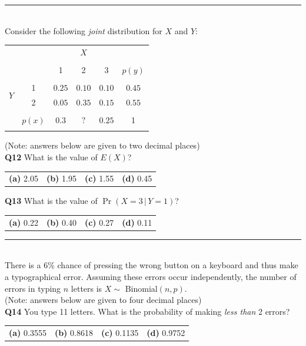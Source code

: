 \documentclass[12pt]{article}
\begin{document}
\rule{\linewidth}{1pt}
\quad\\
Consider the following \emph{joint} distribution for $X$ and $Y$:
\begin{center}
\begin{tabular}{c|c|ccc|c|}
\multicolumn{2}{c}{} & \multicolumn{3}{c}{$X$} & \multicolumn{1}{c}{}\\
\cline{2-6}
&&&&&\\[-0.4cm]
&&                          1 & 2 & 3 & $p(y)$\\
\cline{2-6}
&&&&&\\[-0.3cm]
\multirow{2}{*}{$Y$} & 1 & $0.25$ &  $0.10$  & $0.10$ & $0.45$ \\[0.1cm]
                     & 2 & $0.05$ &  $0.35$  & $0.15$ & $0.55$ \\[0.1cm]
\cline{2-6}
&&&&&\\[-0.3cm]
& $p(x)$ & $0.3$ & $?$ & $0.25$ & 1 \\[0.1cm]
\cline{2-6}
\multicolumn{6}{c}{}\\[-0.4cm]
\end{tabular}
\end{center}
{\footnotesize(Note: answers below are given to two decimal places)}\\[-0.1cm]

{\bf Q12} What is the value of $E(X)$?\\[0.2cm]
\begin{tabular}{cccc}
{\bf(a)} 2.05 & {\bf(b)} 1.95 & {\bf(c)} 1.55 & {\bf(d)} 0.45 \\[0.6cm]
\end{tabular}

{\bf Q13} What is the value of $\Pr(X=3\,|\,Y=1)$?\\[0.2cm]
\begin{tabular}{cccc}
{\bf(a)} 0.22 & {\bf(b)} 0.40 & {\bf(c)} 0.27 & {\bf(d)} 0.11 \\[0.6cm]
\end{tabular}


\rule{\linewidth}{1pt}
\quad\\
There is a 6\% chance of pressing the wrong button on a keyboard and thus make a typographical error. Assuming these errors occur independently, the number of errors in typing $n$ letters is $X \sim$ Binomial$(n,p)$.\\{\footnotesize(Note: answers below are given to four decimal places)}\\[0.3cm]

{\bf Q14} You type 11 letters. What is the probability of making \emph{less than} 2 errors? \\[0.2cm]
\begin{tabular}{cccc}
{\bf(a)} 0.3555 & {\bf(b)} 0.8618 & {\bf(c)} 0.1135 & {\bf(d)} 0.9752 \\[0.6cm]
\end{tabular}
\end{document}
